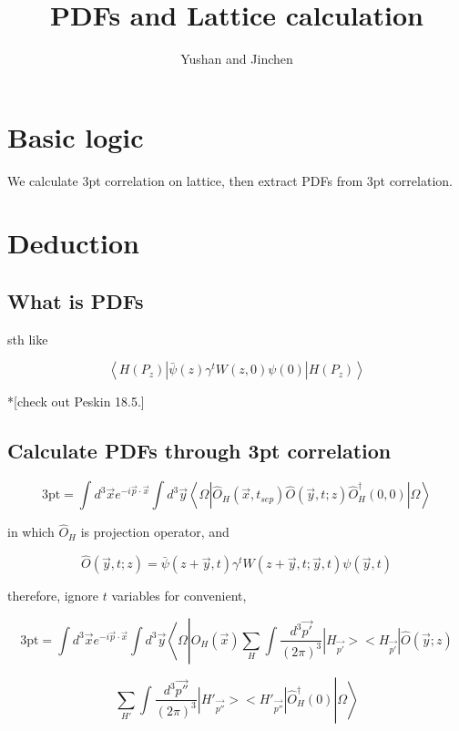 \documentclass[11pt]{article} %
\title{PDFs and Lattice calculation}
\author{Yushan and Jinchen}
\begin{document}
\maketitle

\section{Basic logic}

\noindent 

We calculate 3pt correlation on lattice, then extract PDFs from 3pt correlation.


\section{Deduction}

\subsection{What is PDFs}

\noindent

sth like 

\[ \left\langle H\left(P_{z}\right)\left|\bar{\psi}(z) \gamma^{t} W(z, 0) \psi(0)\right| H\left(P_{z}\right)\right\rangle \]

*[check out Peskin 18.5.]

\subsection{Calculate PDFs through 3pt correlation}

\noindent

\[ \text{3pt} = \int d^{3} \vec{x} e^{-i \vec{p} \cdot \vec{x}} \int d^3 \vec{y}\left\langle\Omega\left|\hat{O}_{H}\left(\vec{x}, t_{s e p}\right) \hat{O}(\vec{y}, t ; z) \hat{O}_{H}^{\dagger}(0,0)\right| \Omega\right\rangle \]

in which $\hat{O}_{H}$ is projection operator, and 

\[ \hat{O}(\vec{y}, t ; z)=\bar{\psi}(z+\vec{y}, t) \gamma^{t} W(z+\vec{y}, t ; \vec{y}, t) \psi(\vec{y}, t) \]

therefore, ignore $t$ variables for convenient,

\[ \text{3pt} = \int d^{3} \vec{x} e^{-i \vec{p} \cdot \vec{x}} \int d^3 \vec{y}\left\langle\Omega\left|\hat{O}_{H}\left(\vec{x}\right) \sum_{H} \int \frac{d^3 \vec{p'}}{(2\pi)^3}  |H_{\vec{p'}}><H_{\vec{p'}}| \hat{O}(\vec{y}; z) \right. \right. \]
    
\[ \left. \left. \sum_{H'} \int \frac{d^3 \vec{p''}}{(2\pi)^3} |H'_{\vec{p''}}><H'_{\vec{p''}}| \hat{O}_{H}^{\dagger}(0)  \right| \Omega\right\rangle \]
\end{document}
